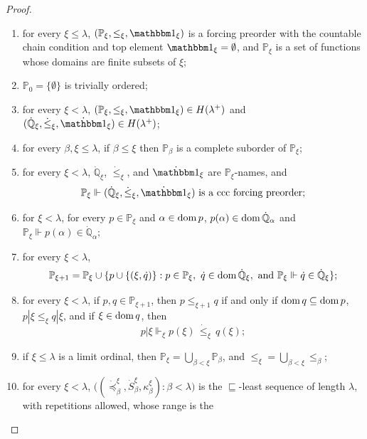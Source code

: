 \begin{proof}
\begin{enumerate}[label=(\arabic*)]
  \item for every $\xi\leq\lambda$, $(\mathbb P_\xi, \leq_\xi, \mathbbm 1_\xi)$ is a forcing preorder with the countable chain condition and top element $\mathbbm 1_\xi=\emptyset$, and $\mathbb P_\xi$ is a set of functions whose domains are finite subsets of $\xi$;\label{item:iteration-ccc}
  \item $\mathbb P_0=\{\emptyset\}$ is trivially ordered;\label{item:iteration-trivial}
  \item for every $\xi<\lambda$, $(\mathbb P_\xi, \leq_\xi, \mathbbm 1_\xi)\in H(\lambda^+)$ and $(\dot{\mathbb Q}_\xi, \dot{\leq}_\xi, \dot{\mathbbm 1}_\xi)\in H(\lambda^+)$;\label{item:hereditarily-small}
  \item for every $\beta, \xi\leq \lambda$, if $\beta\leq \xi$ then $\mathbb P_\beta$ is a complete suborder of $\mathbb P_\xi$;
  \item for every $\xi<\lambda$, $\dot{\mathbb Q}_\xi$, $\dot{\leq}_\xi$,
  and $\dot{\mathbbm 1}_\xi$ are $\mathbb P_\xi$-names, and
  \[
    \mathbb P_\xi\Vdash
    (\dot{\mathbb Q}_\xi,\dot{\leq}_\xi,\dot{\mathbbm 1}_\xi)
    \text{ is a ccc forcing preorder};
  \]
  \item for $\xi<\lambda$, for every $p \in \mathbb P_\xi$ and $\alpha \in \operatorname{dom} p$, $p(\alpha)\in \operatorname{dom} \dot{\mathbb Q}_\alpha$ and $\mathbb P_\xi\Vdash p(\alpha)\in \dot{\mathbb Q}_\alpha$;
  \item \label{item:successor-step} for every $\xi<\lambda$,
  \[
    \mathbb P_{\xi+1}=\mathbb P_\xi\cup
    \{p\cup\{(\xi,\dot q)\}:p\in\mathbb P_\xi,\ 
    \dot q\in\dom\dot{\mathbb Q}_\xi,\text{ and }
    \mathbb P_\xi\Vdash \dot q\in\dot{\mathbb Q}_\xi\};
  \]
  \item \label{item:successor-step-2} for every $\xi<\lambda$, if $p,q\in\mathbb P_{\xi+1}$, then
  $p\leq_{\xi+1}q$ if and only if $\operatorname{dom} q\subseteq\operatorname{dom} p$,
  $p|\xi\leq_\xi q|\xi$, and if $\xi\in\operatorname{dom} q$, then
  \[
    p|\xi\Vdash_\xi p(\xi)\,\dot{\leq}_\xi\, q(\xi);
  \]
  \item if $\xi\leq \lambda$ is a limit ordinal, then
  $\mathbb P_\xi=\bigcup_{\beta<\xi}\mathbb P_\beta$, and
  $\leq_\xi=\bigcup_{\beta<\xi}\leq_\beta$; \label{item:limit-step}
  \item \label{item:listing} for every $\xi<\lambda$, $\bigl((\dot{\preceq}^\xi_\beta,\dot S^\xi_\beta,\kappa^\xi_\beta):
    \beta<\lambda\bigr)$
  is the $\sqsubseteq$-least sequence of length $\lambda$, with repetitions allowed, whose range is the

\end{enumerate}
\end{proof}
